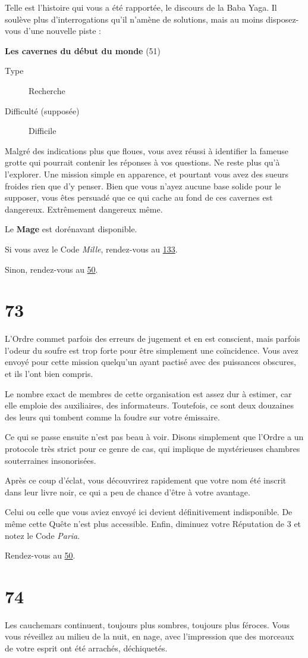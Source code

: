 \documentclass{report}
\newcommand{\gsection}[1]{
    \section{#1}
    \label{section-#1}
}
\newcommand{\glink}[1]{\hyperref[section-#1]{#1}}
\newcommand{\quest}[5]{
    \begin{mdframed}[innertopmargin=0.5cm,innerbottommargin=0.5cm,leftmargin=0.5cm,rightmargin=0.5cm]
        \begin{center}
            \textbf{#1} (#2)
        \end{center}
        \begin{description}
            \item[Type] #3
            \item[Difficulté (supposée)] #4
        \end{description}
        #5
    \end{mdframed}
}
\newcommand{\hero}[1]{\textbf{#1}}
\begin{document}
Telle est l'histoire qui vous a été rapportée, le discours de la Baba Yaga. Il soulève plus d'interrogations qu'il n'amène de solutions, mais au moins disposez-vous d'une nouvelle piste :

\clearpage

\quest{Les cavernes du début du monde}{51}{Recherche}{Difficile}{
Malgré des indications plus que floues, vous avez réussi à identifier la fameuse grotte qui pourrait contenir les réponses à vos questions. Ne reste plus qu'à l'explorer. Une mission simple en apparence, et pourtant vous avez des sueurs froides rien que d'y penser. Bien que vous n'ayez aucune base solide pour le supposer, vous êtes persuadé que ce qui cache au fond de ces cavernes est dangereux. Extrêmement dangereux même.
}

Le \hero{Mage} est dorénavant disponible.

Si vous avez le Code \emph{Mille}, rendez-vous au \glink{133}.

Sinon, rendez-vous au \glink{50}.

\gsection{73}

L'Ordre commet parfois des erreurs de jugement et en est conscient, mais parfois l'odeur du soufre est trop forte pour être simplement une coïncidence. Vous avez envoyé pour cette mission quelqu'un ayant pactisé avec des puissances obscures, et ils l'ont bien compris.

Le nombre exact de membres de cette organisation est assez dur à estimer, car elle emploie des auxiliaires, des informateurs. Toutefois, ce sont deux douzaines des leurs qui tombent comme la foudre sur votre émissaire.

Ce qui se passe ensuite n'est pas beau à voir. Disons simplement que l'Ordre a un protocole très strict pour ce genre de cas, qui implique de mystérieuses chambres souterraines insonorisées.

Après ce coup d'éclat, vous découvrirez rapidement que votre nom été inscrit dans leur livre noir, ce qui a peu de chance d'être à votre avantage.

Celui ou celle que vous aviez envoyé ici devient définitivement indisponible. De même cette Quête n'est plus accessible. Enfin, diminuez votre Réputation de 3 et notez le Code \emph{Paria}.

Rendez-vous au \glink{50}.

\gsection{74}

Les cauchemars continuent, toujours plus sombres, toujours plus féroces. Vous vous réveillez au milieu de la nuit, en nage, avec l'impression que des morceaux de votre esprit ont été arrachés, déchiquetés.
\end{document}

